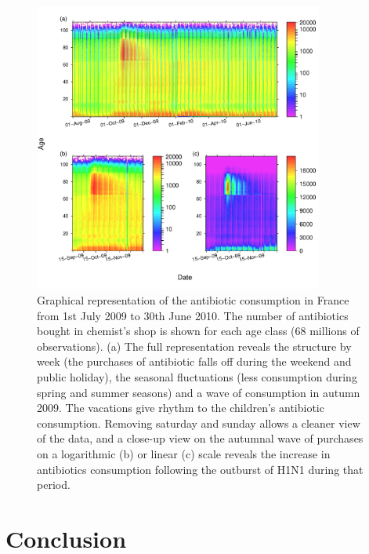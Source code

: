 \begin{figure}[!h] %
\centering
\includegraphics[width=0.85\textwidth]{2_Methodo/Fig/Fig22-4.pdf}
\caption[Antibiotic consumption in France]{ Graphical representation of the antibiotic consumption in France from 1st July
2009 to 30th June 2010. The number of antibiotics bought in chemist’s shop is
shown for each age class (68 millions of observations). (a) The full
representation reveals the structure by week (the purchases of antibiotic falls
off during the weekend and public holiday), the seasonal fluctuations (less
consumption during spring and summer seasons) and a wave of consumption in
autumn 2009. The vacations give rhythm to the children’s antibiotic consumption.
Removing saturday and sunday allows a cleaner view of the data, and a close-up
view on the autumnal wave of purchases on a logarithmic (b) or linear (c) scale
reveals the increase in antibiotics consumption following the outburst of H1N1
during that period.
}
\label{Fig22-4}
\end{figure}


\section{Conclusion}

